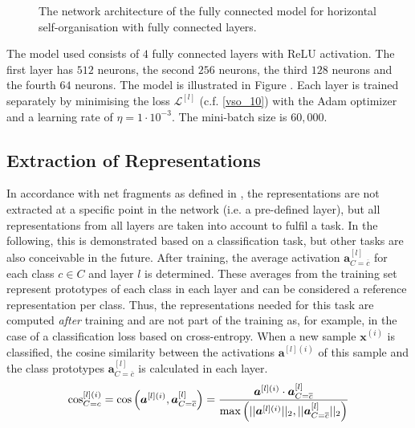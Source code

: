 \begin{figure}[h]
{
}
    \caption[Architecture of the fully connected model with horizontal self-organisation]{The network architecture of the fully connected model for horizontal self-organisation with fully connected layers.}
\end{figure}

The model used consists of $4$ fully connected layers with ReLU activation. The first layer has $512$ neurons, the second $256$ neurons, the third $128$ neurons and the fourth $64$ neurons. The model is illustrated in Figure . Each layer is trained separately by minimising the loss  $\mathcal{L}^{[l]}$ (c.f. \eqref{vso_10}) with the Adam optimizer  and a learning rate of $\eta = 1 \cdot 10^{-3}$. The mini-batch size is $60,000$. 

\subsection{Extraction of Representations}
In accordance with net fragments as defined in , the representations are not extracted at a specific point in the network (i.e. a pre-defined layer), but all representations from all layers are taken into account to fulfil a task.
In the following, this is demonstrated based on a classification task, but other tasks are also conceivable in the future.
After training, the average activation {\footnotesize $\boldsymbol{a}^{[l]}_{C=\overline{c}}$} for each class $c \in C$ and layer $l$ is determined.
These averages from the training set represent prototypes of each class in each layer and can be considered a reference representation per class. Thus, the representations needed for this task are computed \emph{after} training and are not part of the training as, for example, in the case of a classification loss based on cross-entropy.
When a new sample $\boldsymbol{x}^{(i)}$ is classified, the cosine similarity between the activations {\footnotesize $\boldsymbol{a}^{[l](i)}$} of this sample and the class prototypes {\footnotesize $\boldsymbol{a}^{[l]}_{C=\overline{c}}$} is calculated in each layer.
%
\begin{align}\eqlbl{vso_11}
		\text{cos}^{[l](i)}_{C=c} = \text{cos} \left( \boldsymbol{a}^{[l](i)}, \boldsymbol{a}^{[l]}_{C=\overline{c}} \right) = \frac{\boldsymbol{a}^{[l](i)} \cdot \boldsymbol{a}^{[l]}_{C=\overline{c}}}{\max \left( ||\boldsymbol{a}^{[l](i)}||_2, ||\boldsymbol{a}^{[l]}_{C=\overline{c}}||_2 \right) }
\end{align}

